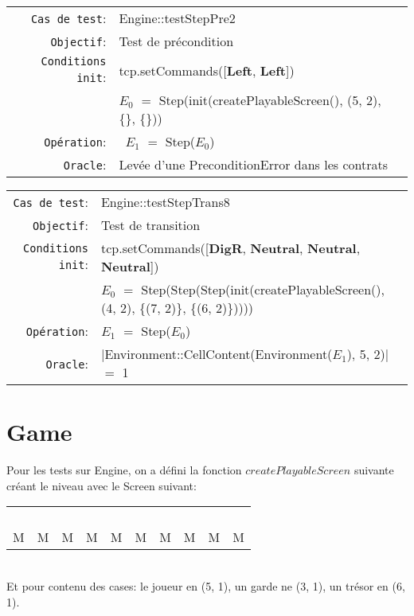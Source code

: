 \documentclass{article}
\begin{document}
{\small
  \begin{longtable}{rl}
    \texttt{Cas de test}: &\textrm{Engine::testStepPre2}\\
    \texttt{Objectif}: & Test de précondition\\
    \texttt{Conditions init}: & \textrm{tcp.setCommands([\textbf{Left}, \textbf{Left}])}\\
    & $E_0$ $=$ \textrm{Step(init(createPlayableScreen(), (5, 2), \{\}, \{\}))}\\
    \texttt{Opération}: &\ $E_1$ $=$ \textrm{Step($E_0$)}\\
    \texttt{Oracle}: & Levée d'une \textrm{PreconditionError} dans les contrats\\
  \end{longtable}}

{\small
  \begin{longtable}{rl}
    \texttt{Cas de test}: &\textrm{Engine::testStepTrans8}\\
    \texttt{Objectif}: & Test de transition \\
    \texttt{Conditions init}: & \textrm{tcp.setCommands([\textbf{DigR}, \textbf{Neutral}, \textbf{Neutral}, \textbf{Neutral}])}\\
    & $E_0$ $=$ \textrm{Step(Step(Step(init(createPlayableScreen(), (4, 2), \{(7, 2)\}, \{(6, 2)\}))))}\\
    \texttt{Opération}: &$E_1$ $=$ \textrm{Step($E_0$)}\\
    \texttt{Oracle}: &\textrm{$|$Environment::CellContent(Environment($E_1$), 5, 2)$|$} $=$ 1\\
  \end{longtable}}

\section{Game}

Pour les tests sur Engine, on a défini la fonction $createPlayableScreen$ suivante créant le niveau avec le Screen suivant:\\
\begin{tabular}{cccccccccc}
   & & & & & & & & & \\
   & & & & & & & & & \\
   & & & & & & & & & \\
   & & & & & & & & &\\
  M&M&M&M&M&M&M&M&M&M
\end{tabular}\\
\noindent Et pour contenu des cases: le joueur en (5, 1), un garde ne (3, 1), un trésor en (6, 1).
\end{document}
